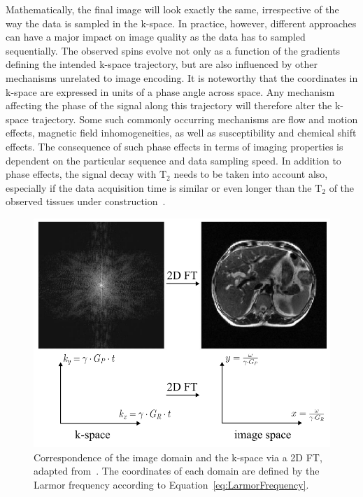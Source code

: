 \documentclass[english,version-2022-01]{uzl-thesis} %
\begin{document}
Mathematically, the final image will look exactly the same, irrespective of the way the data is sampled in the k-space. In practice, however, different approaches 
can have a major impact on image quality
as the data has to 
sampled
sequentially. The observed spins evolve not only as a function of the gradients defining the intended k-space trajectory, but are also influenced by other mechanisms unrelated to image encoding. It is noteworthy that the coordinates in k-space are expressed in units of a phase angle across space. Any mechanism affecting the phase of the signal along this trajectory will therefore alter the k-space trajectory. Some such commonly occurring mechanisms are flow and motion effects, magnetic field inhomogeneities, as well as susceptibility and chemical shift effects. The consequence of such phase effects in terms of imaging properties is dependent on the particular sequence and data sampling speed. In addition to phase effects, the signal decay with $\text{T}_2$ needs to be taken into account also, especially if the data acquisition time is similar or even longer than the $\text{T}_2$ of the observed tissues under construction~\cite{SamplingStrategies}.

\begin{figure}[h] %
	\centering
	\graphicspath{{images/}{\main/images/}}
	\includegraphics[width=0.75\linewidth]{2D_MRI_Measurement.png} 
	\caption{Correspondence of the image domain and the k-space via a 2D FT, adapted from~\cite{SamplingStrategies}. The coordinates of each domain are defined by the Larmor frequency according to Equation~\ref{eq:LarmorFrequency}.}
	\label{fig:2D_MRI_Measurement}
\end{figure}
\end{document}
